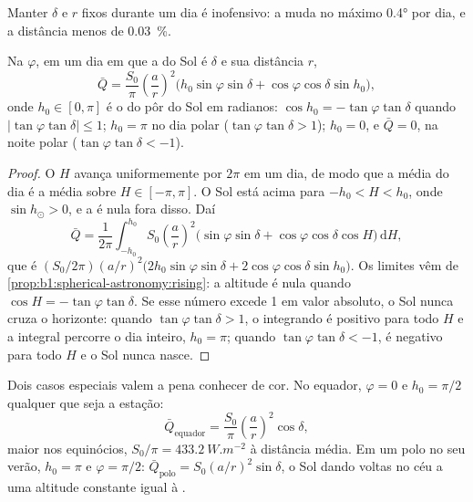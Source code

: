 Manter $\delta$ e $r$ fixos durante um dia é inofensivo: a  muda no máximo \ang{0.4} por
dia, e a distância menos de \qty{0.03}{\percent}.

\begin{theorem}\label{thm:b1:radiation-heat-transport:daily}
Na  $\varphi$, em um dia em que a  do Sol é $\delta$ e sua distância $r$,
\[
  \bar Q = \frac{S_0}{\pi}\left(\frac{a}{r}\right)^{2}
  \bigl(h_0\sin\varphi\sin\delta + \cos\varphi\cos\delta\sin h_0\bigr),
\]
onde $h_0 \in [0, \pi]$ é o  do pôr do Sol em radianos: $\cos h_0 =
-\tan\varphi\tan\delta$ quando $|\tan\varphi\tan\delta| \le 1$; $h_0 = \pi$ no dia polar
($\tan\varphi\tan\delta > 1$); $h_0 = 0$, e $\bar Q = 0$, na noite polar ($\tan\varphi\tan\delta < -1$).
\end{theorem}

\begin{proof}
O  $H$ avança uniformemente por $2\pi$ em um dia, de modo que a média do dia é a
média sobre $H \in [-\pi, \pi]$. O Sol está acima para $-h_0 < H < h_0$, onde $\sin h_\odot > 0$,
e a  é nula fora disso. Daí
\[
  \bar Q = \frac{1}{2\pi}\int_{-h_0}^{h_0} S_0\left(\frac{a}{r}\right)^{2}
  \bigl(\sin\varphi\sin\delta + \cos\varphi\cos\delta\cos H\bigr)\,\mathrm dH ,
\]
que é $(S_0/2\pi)(a/r)^2\bigl(2h_0\sin\varphi\sin\delta +
2\cos\varphi\cos\delta\sin h_0\bigr)$.
Os limites vêm de \cref{prop:b1:spherical-astronomy:rising}: a altitude é nula quando $\cos H = -\tan\varphi\tan\delta$. Se esse número excede 1 em valor absoluto, o Sol nunca cruza o horizonte:
quando $\tan\varphi\tan\delta > 1$, o integrando é positivo para todo $H$ e a integral percorre o
dia inteiro, $h_0 = \pi$; quando $\tan\varphi\tan\delta < -1$, é negativo para todo $H$ e o Sol
nunca nasce.
\end{proof}

Dois casos especiais valem a pena conhecer de cor. No equador, $\varphi = 0$ e $h_0 = \pi/2$
qualquer que seja a estação:
\[
  \bar Q_\text{equador} = \frac{S_0}{\pi}\left(\frac{a}{r}\right)^{2}\cos\delta ,
\]
maior nos equinócios, $S_0/\pi = \qty{433.2}{W.m^{-2}}$ à distância média. Em um polo no seu verão,
$h_0 = \pi$ e $\varphi = \pi/2$: $\bar Q_\text{polo} =
S_0(a/r)^2\sin\delta$, o Sol dando voltas no céu a uma altitude constante igual à .

